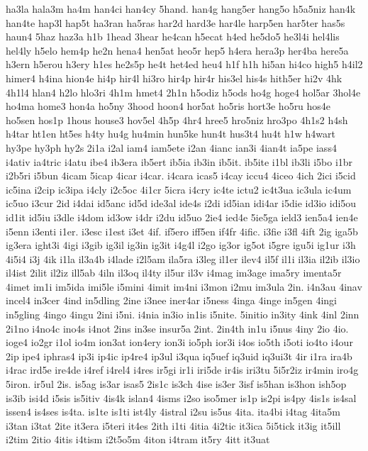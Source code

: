 {ha3la
hala3m
ha4m
han4ci
han4cy
5hand.
han4g
hang5er
hang5o
h5a5niz
han4k
han4te
hap3l
hap5t
ha3ran
ha5ras
har2d
hard3e
har4le
harp5en
har5ter
has5s
haun4
5haz
haz3a
h1b
1head
3hear
he4can
h5ecat
h4ed
he5do5
he3l4i
hel4lis
hel4ly
h5elo
hem4p
he2n
hena4
hen5at
heo5r
hep5
h4era
hera3p
her4ba
here5a
h3ern
h5erou
h3ery
h1es
he2s5p
he4t
het4ed
heu4
h1f
h1h
hi5an
hi4co
high5
h4il2
himer4
h4ina
hion4e
hi4p
hir4l
hi3ro
hir4p
hir4r
his3el
his4s
hith5er
hi2v
4hk
4h1l4
hlan4
h2lo
hlo3ri
4h1m
hmet4
2h1n
h5odiz
h5ods
ho4g
hoge4
hol5ar
3hol4e
ho4ma
home3
hon4a
ho5ny
3hood
hoon4
hor5at
ho5ris
hort3e
ho5ru
hos4e
ho5sen
hos1p
1hous
house3
hov5el
4h5p
4hr4
hree5
hro5niz
hro3po
4h1s2
h4sh
h4tar
ht1en
ht5es
h4ty
hu4g
hu4min
hun5ke
hun4t
hus3t4
hu4t
h1w
h4wart
hy3pe
hy3ph
hy2s
2i1a
i2al
iam4
iam5ete
i2an
4ianc
ian3i
4ian4t
ia5pe
iass4
i4ativ
ia4tric
i4atu
ibe4
ib3era
ib5ert
ib5ia
ib3in
ib5it.
ib5ite
i1bl
ib3li
i5bo
i1br
i2b5ri
i5bun
4icam
5icap
4icar
i4car.
i4cara
icas5
i4cay
iccu4
4iceo
4ich
2ici
i5cid
ic5ina
i2cip
ic3ipa
i4cly
i2c5oc
4i1cr
5icra
i4cry
ic4te
ictu2
ic4t3ua
ic3ula
ic4um
ic5uo
i3cur
2id
i4dai
id5anc
id5d
ide3al
ide4s
i2di
id5ian
idi4ar
i5die
id3io
idi5ou
id1it
id5iu
i3dle
i4dom
id3ow
i4dr
i2du
id5uo
2ie4
ied4e
5ie5ga
ield3
ien5a4
ien4e
i5enn
i3enti
i1er.
i3esc
i1est
i3et
4if.
if5ero
iff5en
if4fr
4ific.
i3fie
i3fl
4ift
2ig
iga5b
ig3era
ight3i
4igi
i3gib
ig3il
ig3in
ig3it
i4g4l
i2go
ig3or
ig5ot
i5gre
igu5i
ig1ur
i3h
4i5i4
i3j
4ik
i1la
il3a4b
i4lade
i2l5am
ila5ra
i3leg
il1er
ilev4
il5f
il1i
il3ia
il2ib
il3io
il4ist
2ilit
il2iz
ill5ab
4iln
il3oq
il4ty
il5ur
il3v
i4mag
im3age
ima5ry
imenta5r
4imet
im1i
im5ida
imi5le
i5mini
4imit
im4ni
i3mon
i2mu
im3ula
2in.
i4n3au
4inav
incel4
in3cer
4ind
in5dling
2ine
i3nee
iner4ar
i5ness
4inga
4inge
in5gen
4ingi
in5gling
4ingo
4ingu
2ini
i5ni.
i4nia
in3io
in1is
i5nite.
5initio
in3ity
4ink
4inl
2inn
2i1no
i4no4c
ino4s
i4not
2ins
in3se
insur5a
2int.
2in4th
in1u
i5nus
4iny
2io
4io.
ioge4
io2gr
i1ol
io4m
ion3at
ion4ery
ion3i
io5ph
ior3i
i4os
io5th
i5oti
io4to
i4our
2ip
ipe4
iphras4
ip3i
ip4ic
ip4re4
ip3ul
i3qua
iq5uef
iq3uid
iq3ui3t
4ir
i1ra
ira4b
i4rac
ird5e
ire4de
i4ref
i4rel4
i4res
ir5gi
ir1i
iri5de
ir4is
iri3tu
5i5r2iz
ir4min
iro4g
5iron.
ir5ul
2is.
is5ag
is3ar
isas5
2is1c
is3ch
4ise
is3er
3isf
is5han
is3hon
ish5op
is3ib
isi4d
i5sis
is5itiv
4is4k
islan4
4isms
i2so
iso5mer
is1p
is2pi
is4py
4is1s
is4sal
issen4
is4ses
is4ta.
is1te
is1ti
ist4ly
4istral
i2su
is5us
4ita.
ita4bi
i4tag
4ita5m
i3tan
i3tat
2ite
it3era
i5teri
it4es
2ith
i1ti
4itia
4i2tic
it3ica
5i5tick
it3ig
it5ill
i2tim
2itio
4itis
i4tism
i2t5o5m
4iton
i4tram
it5ry
4itt
it3uat
}
